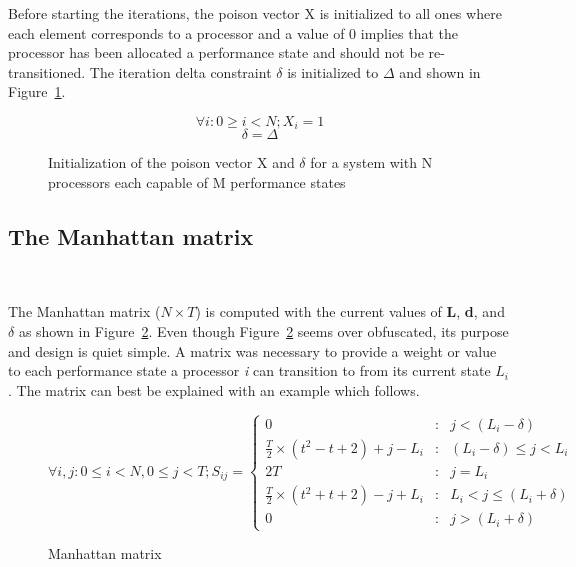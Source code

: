 Before starting the iterations, the poison vector X is initialized to all ones where
each element corresponds to a processor and a value of 0 implies that the processor
has been allocated a performance state and should not be re-transitioned. 
The iteration delta constraint $\delta$ is initialized to $\Delta$ and shown 
in Figure~\ref{fig:init_X}.

\begin{figure}[h!]
\centering
\begin{equation*}
    \forall i : 0 \geq i < N; X_{i} = 1 
\end{equation*}
\begin{equation*}
    \delta = \Delta
\end{equation*}
\caption{Initialization of the poison vector X and $\delta$ for a system with N processors each capable of M performance states}
\label{fig:init_X}
\end{figure}

\subsection{The Manhattan matrix}~\label{sec:delta_matrix}

The Manhattan matrix ($N \times T$) is computed with the current values of \textbf{L}, \textbf{d}, and 
$\delta$ as shown in Figure~\ref{fig:delta_mat}. Even though Figure~\ref{fig:delta_mat} seems over 
obfuscated, its purpose and design is quiet simple. A matrix was necessary to provide a weight or value
to each performance state a processor \textit{i} can transition to from its current state $L_i$. The
matrix can best be explained with an example which follows.

\begin{figure}[h!]
\centering
\begin{equation*}
    \forall i,j: 0 \leq i < N, 0 \leq j < T; S_{ij} = \left\{
     \begin{array}{lcr}
       0 & : & j < (L_{i} - \delta) \\
       \frac{T}{2} \times (t^{2} - t + 2) + j - L_{i} & : & (L_{i} - \delta) \leq j < L_{i} \\
       2T & : & j = L_{i}\\
       \frac{T}{2} \times (t^{2} + t + 2) - j + L_{i} & : & L_{i} < j \leq (L_{i} + \delta) \\
       0 & : & j > (L_{i} + \delta)
     \end{array}
   \right.
\end{equation*}
\caption{Manhattan matrix}
\label{fig:delta_mat}
\end{figure}

